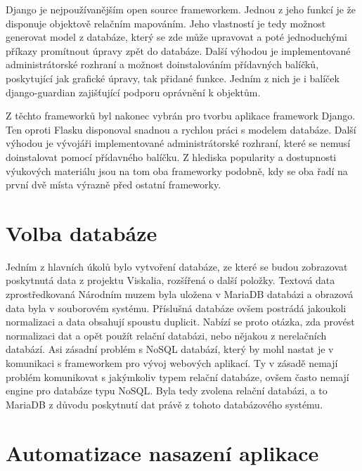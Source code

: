 Django je nejpoužívanějším open source frameworkem. Jednou z jeho funkcí je že
disponuje objektově relačním mapováním. Jeho vlastností je tedy možnost generovat
model z databáze, který se zde může upravovat a poté jednoduchými
příkazy promítnout úpravy zpět do databáze. Další výhodou je implementované
administrátorské rozhraní a možnost doinstalováním přídavných balíčků,
poskytující jak grafické úpravy, tak přidané funkce. Jedním z nich je
i balíček django-guardian zajišťující podporu oprávnění k objektům. \cite{django}


Z těchto frameworků byl nakonec vybrán pro tvorbu aplikace framework
Django. Ten oproti Flasku disponoval snadnou a rychlou práci s modelem
databáze. Další výhodou je vývojáři implementované administrátorské
rozhraní, které se nemusí doinstalovat pomocí přídavného balíčku. Z
hlediska popularity a dostupnosti výuko\-vých materiálu jsou na tom oba
frameworky podobně, kdy se oba řadí na první dvě místa výrazně před
ostatní frameworky.

\vspace{10px}

\section{Volba databáze}

Jedním z hlavních úkolů bylo vytvoření databáze, ze které se budou
zobrazovat poskytnutá data z projektu Viskalia, rozšířená o další
položky. Textová data zpro\-středkovaná Národním muzem byla uložena v
MariaDB databázi a obrazová data byla v souborovém systému. Příslušná
databáze ovšem postrádá jakoukoli normalizaci a data obsahují spoustu
duplicit. Nabízí se proto otázka, zda provést normalizaci dat a opět
použít relační databázi, nebo nějakou z nerelačních
databází. Asi zásadní problém s NoSQL databází, který by mohl nastat
je v komunikaci s frameworkem pro vývoj webových aplikací. Ty
v zásadě nemají problém komunikovat s jakýmkoliv typem relační
databáze, ovšem často nemají engine pro databáze typu NoSQL. Byla 
tedy zvolena relační databázi, a to MariaDB z důvodu poskytnutí dat právě
z tohoto databázového systému. \cite{django} \cite{mariadb}

\newpage

\section{Automatizace nasazení aplikace}


